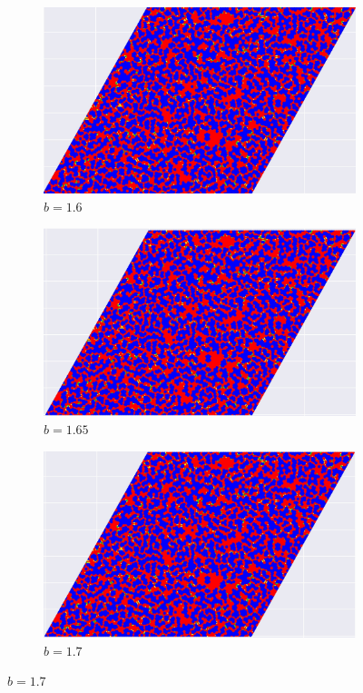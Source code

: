 \documentclass[12pt]{article}
\begin{document}
\begin{figure}[!htbp]
        \begin{subfigure}{.33\textwidth}
          \centering
          \includegraphics[width=.9\linewidth]{TriangularMeanFieldGame/triangular_snapshot_b=16.jpg}
          \caption{$b=1.6$}
          \label{fig:trsub4}
        \end{subfigure}%
        \begin{subfigure}{.33\textwidth}
          \centering
          \includegraphics[width=.9\linewidth]{TriangularMeanFieldGame/triangular_snapshot_b=165.jpg}
          \caption{$b=1.65$}
          \label{fig:trsub5}
        \end{subfigure}%
        \begin{subfigure}{.33\textwidth}
          \centering
          \includegraphics[width=.9\linewidth]{TriangularMeanFieldGame/triangular_snapshot_b=17.jpg}
          \caption{$b=1.7$}
          \label{fig:trsub6}
        \end{subfigure}
        

\end{figure}
\end{document}
